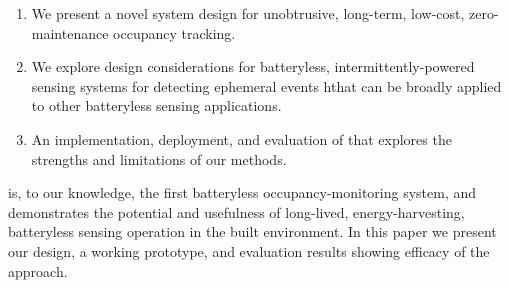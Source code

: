 \begin{enumerate}[label=\arabic*., align=left, leftmargin=*]
	\item We present a novel system design for unobtrusive, long-term, low-cost, zero-maintenance occupancy tracking.
	\item We explore design considerations for batteryless, intermittently-powered sensing systems for detecting ephemeral events hthat can be broadly applied to other batteryless sensing applications.
	\item An implementation, deployment, and evaluation of \sysname that explores the strengths and limitations of our methods.
\end{enumerate}

\noind
\sysname is, to our knowledge, the first batteryless occupancy-monitoring system, and demonstrates the potential and usefulness of long-lived, energy-harvesting, batteryless sensing operation in the built environment.
In this paper we present our design, a working prototype, and evaluation results showing efficacy of the approach.


